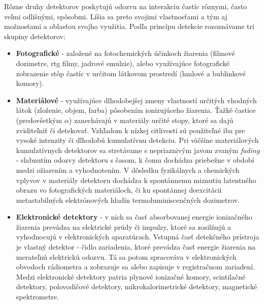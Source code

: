 \documentclass[../../main.tex]{subfiles}
\begin{document}
Rôzne druhy detektorov poskytujú odozvu na interakciu častíc rôznymi, často veľmi odlišnými, spôsobmi. Líšia sa preto svojimi vlastnosťami a tým aj možnosťami a oblasťou svojho využitia. Podľa princípu detekcie rozoznávame tri skupiny detektorov:
\begin{itemize}
\item \textbf{Fotografické} - založené na fotochemických účinkoch žiarenia (filmové dozimetre, rtg filmy, jadrové emulzie), alebo využívajúce fotografické zobrazenie stôp častíc v určitom látkovom prostredí (hmlové a bublinkové komory).

\item \textbf{Materiálové} - využívajúce dlhodobejšej zmeny vlastností určitých vhodných látok (zloženie, objem, farba) pôsobením ionizujúceho žiarenia. Ťažké častice (predovšetkým $\alpha$) zanechávajú v materiály určité stopy, ktoré sa dajú zviditeľniť či detekovať. Vzhľadom k nízkej citlivosti sú použiteľné iba pre vysoké intenzity či dlhodobú kumulatívnu detekciu. Pri väčšine materiálových kumulatívnych detektorov sa stretávame s nepriaznivým javom zvaným \textit{fading} - slabnutím odozvy detektoru s časom, k čomu dochádza priebežne v období medzi ožiarením a vyhodnotením. V dôsledku fyzikálnych a chemických vplyvov v materiály detektoru dochádza k spontánnemu miznutiu latentného obrazu vo fotografických materiáloch, či ku spontánnej deexcitácii metastabilných elektrónových hladín termoluminiscenčných dozimetrov.

\item \textbf{Elektronické detektory} - v nich sa časť absorbovanej energie ionizačného žiarenia prevádza na elektrické prúdy či impulzy, ktoré sa zosilňujú a vyhodnocujú v elektronických aparatúrach. Vstupná časť detekčného prístroja je vlastný detektor - čidlo zariadenia, ktoré prevádza časť energie žiarenia na merateľnú elektrickú odozvu. Tá sa potom spracováva v elektronických obvodoch rádiometra a zobrazuje sa alebo zapisuje v registračnom zariadení. Medzi elektronické detektory patria plynové ionizačné komory, scintilačné detektory, polovodičové detektory, mikrokalorimetrické detektory, magnetické spektrometre.
\end{itemize}
\end{document}
